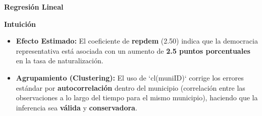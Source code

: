 \documentclass[12pt]{article}
\begin{document}
\begin{center}
    \textbf{Regresión Lineal}
\end{center}

\begin{table}[H] %
    \centering
    \caption{Resultados de Regresión Lineal con Errores Agrupados}
\end{table}

\vspace{0.3cm}

\noindent\textbf{Intuición}
\begin{itemize}
    \item \textbf{Efecto Estimado:} El coeficiente de \textbf{repdem} (2.50) indica que la democracia representativa está asociada con un aumento de \textbf{2.5 puntos porcentuales} en la tasa de naturalización.
    \item \textbf{Agrupamiento (Clustering):} El uso de `cl(muniID)` corrige los errores estándar por \textbf{autocorrelación} dentro del municipio (correlación entre las observaciones a lo largo del tiempo para el mismo municipio), haciendo que la inferencia sea \textbf{válida} y \textbf{conservadora}.
\end{itemize}
\end{document}
